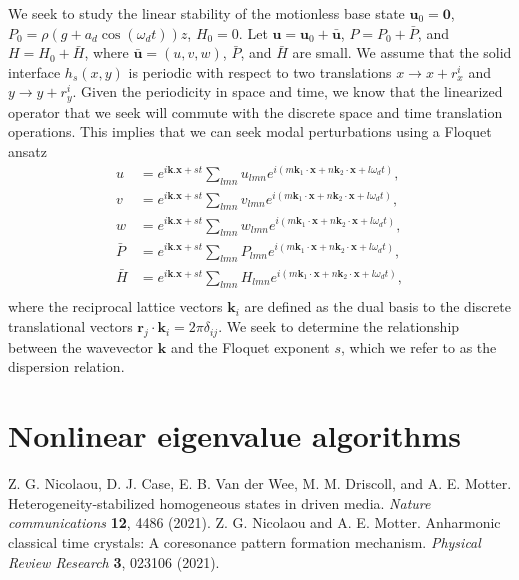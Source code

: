 \documentclass[aps,pre,amsmath,amssymb,floatfix,onecolumn,notitlepage,10pt]{revtex4-1}
\begin{document}
We seek to study the linear stability of the motionless base state $\mathbf{u}_0 = \mathbf{0}$, $P_0 = \rho(g+a_d\cos(\omega_d t))z$, $H_0=0$. Let $\mathbf{u} = \mathbf{u}_0 + \bar{\mathbf{u}}$, $P=P_0+\bar{P}$, and $H=H_0+\bar{H}$, where $\bar{\mathbf{u}} = (u,v,w)$, $\bar{P}$, and $\bar{H}$ are small.  We assume that the solid interface $h_s(x, y)$ is periodic with respect to two translations $x\to x+r^i_x$ and $y\to y+r^i_y$. Given the periodicity in space and time, we know that the linearized operator that we seek will commute with the discrete space and time translation operations. This implies that we can seek modal perturbations using a Floquet ansatz
\begin{align}
u &= e^{i\mathbf{k}.\mathbf{x} + s t}\sum_{lmn} u_{lmn} e^{i(m\mathbf{k}_1\cdot \mathbf{x} + n\mathbf{k}_2\cdot \mathbf{x} + l\omega_d t)}, \\
v &= e^{i\mathbf{k}.\mathbf{x} + s t}\sum_{lmn} v_{lmn} e^{i(m\mathbf{k}_1\cdot \mathbf{x} + n\mathbf{k}_2\cdot \mathbf{x} + l\omega_d t)}, \\
w &= e^{i\mathbf{k}.\mathbf{x} + s t}\sum_{lmn} w_{lmn} e^{i(m\mathbf{k}_1\cdot \mathbf{x} + n\mathbf{k}_2\cdot \mathbf{x} + l\omega_d t)}, \\
\bar{P} &= e^{i\mathbf{k}.\mathbf{x} + s t}\sum_{lmn} P_{lmn} e^{i(m\mathbf{k}_1\cdot \mathbf{x} + n\mathbf{k}_2\cdot \mathbf{x} + l\omega_d t)}, \\
\bar{H} &= e^{i\mathbf{k}.\mathbf{x} + s t}\sum_{lmn} H_{lmn} e^{i(m\mathbf{k}_1\cdot \mathbf{x} + n\mathbf{k}_2\cdot \mathbf{x} + l\omega_d t)}, \\
\end{align}
where the reciprocal lattice vectors $\mathbf{k}_i$ are defined as the dual basis to the discrete translational vectors $\mathbf{r}_j \cdot \mathbf{k}_i = 2\pi\delta_{ij}$. We seek to determine the relationship between the wavevector $\mathbf{k}$ and the Floquet exponent $s$, which we refer to as the dispersion relation.


\section{Nonlinear eigenvalue algorithms}


\begin{thebibliography}{99}
 Z. G. Nicolaou, D. J. Case, E. B. Van der Wee, M. M. Driscoll, and A. E. Motter. Heterogeneity-stabilized homogeneous states in driven media. \textit{Nature communications} \textbf{12}, 4486 (2021).
 Z. G. Nicolaou and A. E. Motter. Anharmonic classical time crystals: A coresonance pattern formation mechanism. \textit{Physical Review Research} \textbf{3}, 023106 (2021).
\end{thebibliography}
\end{document}
